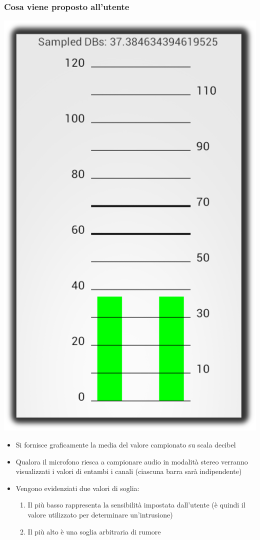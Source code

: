 \documentclass{beamer}
\begin{document}
\begin{frame}
\frametitle{Cosa viene proposto all'utente}
\begin{minipage}[c]{.25\textwidth}
\includegraphics[scale=.18]{./img/microphone.png}
\end{minipage}\begin{minipage}[c]{.65\textwidth}
\begin{itemize}
  \item Si fornisce graficamente la media del valore campionato su scala decibel
  \item Qualora il microfono riesca a campionare audio in modalità stereo verranno visualizzati i valori di entambi i canali (ciascuna barra sarà indipendente)
  \item Vengono evidenziati due valori di soglia:
    \begin{enumerate}
      \item Il più basso rappresenta la sensibilità impostata dall'utente (è quindi il valore utilizzato per determinare un'intrusione)
      \item Il più alto è una soglia arbitraria di rumore
    \end{enumerate}
\end{itemize}
\end{minipage}
\end{frame}
\end{document}
